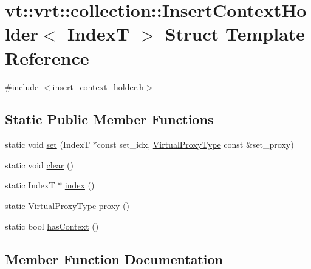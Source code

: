 \hypertarget{structvt_1_1vrt_1_1collection_1_1_insert_context_holder}{}\section{vt\+:\+:vrt\+:\+:collection\+:\+:Insert\+Context\+Holder$<$ IndexT $>$ Struct Template Reference}
\label{structvt_1_1vrt_1_1collection_1_1_insert_context_holder}


{\ttfamily \#include $<$insert\+\_\+context\+\_\+holder.\+h$>$}

\subsection*{Static Public Member Functions}
\begin{DoxyCompactItemize}
\item 
static void \hyperlink{structvt_1_1vrt_1_1collection_1_1_insert_context_holder_a6a045a1b570fcbabd30db317386a3a39}{set} (IndexT $\ast$const set\+\_\+idx, \hyperlink{namespacevt_a1b417dd5d684f045bb58a0ede70045ac}{Virtual\+Proxy\+Type} const \&set\+\_\+proxy)
\item 
static void \hyperlink{structvt_1_1vrt_1_1collection_1_1_insert_context_holder_a6223a4bd0422fa22d81972bedb246bdb}{clear} ()
\item 
static IndexT $\ast$ \hyperlink{structvt_1_1vrt_1_1collection_1_1_insert_context_holder_aba5840488b51c1274ca0f6fb4b6bc0f7}{index} ()
\item 
static \hyperlink{namespacevt_a1b417dd5d684f045bb58a0ede70045ac}{Virtual\+Proxy\+Type} \hyperlink{structvt_1_1vrt_1_1collection_1_1_insert_context_holder_a29cfb4e5c041062dff15b25e198db1a3}{proxy} ()
\item 
static bool \hyperlink{structvt_1_1vrt_1_1collection_1_1_insert_context_holder_a5b08452039d70ebb5cef640bfeb5c2ee}{has\+Context} ()
\end{DoxyCompactItemize}


\subsection{Member Function Documentation}
\mbox{\label{structvt_1_1vrt_1_1collection_1_1_insert_context_holder_a6223a4bd0422fa22d81972bedb246bdb}} 
